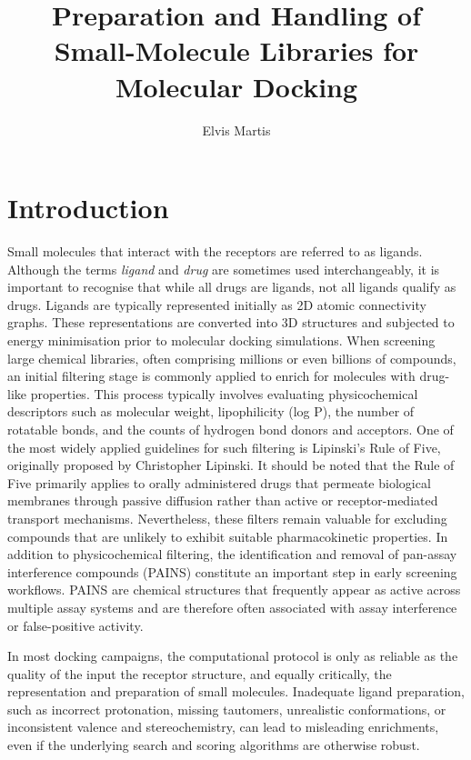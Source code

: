 \documentclass[12pt, a4paper]{article}
\title{Preparation and Handling of Small-Molecule Libraries for Molecular Docking}
\author{Elvis Martis}
\begin{document}
\maketitle

\section{Introduction}

Small molecules that interact with the receptors are referred to as ligands. Although the terms \emph{ligand} and \emph{drug} are sometimes used interchangeably, it is important to recognise that while all drugs are ligands, not all ligands qualify as drugs. Ligands are typically represented initially as 2D atomic connectivity graphs. These representations are converted into 3D structures and subjected to energy minimisation prior to molecular docking simulations. When screening large chemical libraries, often comprising millions or even billions of compounds, an initial filtering stage is commonly applied to enrich for molecules with drug-like properties. This process typically involves evaluating physicochemical descriptors such as molecular weight, lipophilicity (log P), the number of rotatable bonds, and the counts of hydrogen bond donors and acceptors. One of the most widely applied guidelines for such filtering is Lipinski’s Rule of Five, originally proposed by Christopher Lipinski\cite{CH6_lipinski1997}.  It should be noted that the Rule of Five primarily applies to orally administered drugs that permeate biological membranes through passive diffusion rather than active or receptor-mediated transport mechanisms. Nevertheless, these filters remain valuable for excluding compounds that are unlikely to exhibit suitable pharmacokinetic properties. In addition to physicochemical filtering, the identification and removal of pan-assay interference compounds (PAINS)\cite{CH6_baell2010} constitute an important step in early screening workflows. PAINS are chemical structures that frequently appear as active across multiple assay systems and are therefore often associated with assay interference or false-positive activity. 

In most docking campaigns, the computational protocol is only as reliable as the quality of the input  the receptor structure, and equally critically, the representation and preparation of small molecules. Inadequate ligand preparation, such as incorrect protonation, missing tautomers, unrealistic conformations, or inconsistent valence and stereochemistry, can lead to misleading enrichments, even if the underlying search and scoring algorithms are otherwise robust.\cite{CH6_Sastry2013,CH6_kolb2009,CH6_KeyTopicsDocking} 
\end{document}
